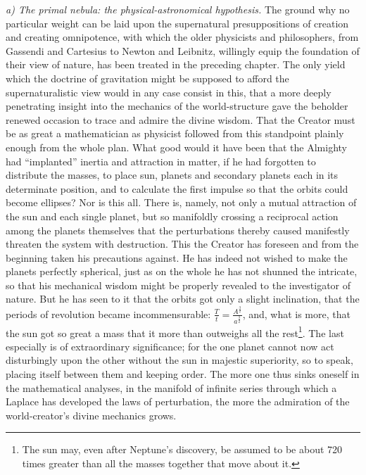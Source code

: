 \documentclass[12pt,a4paper]{book}
\newcommand{\runin}[1]{\emph{#1}\hspace{0.4em}}
\begin{document}
\runin{a) The primal nebula: the physical-astronomical hypothesis.} The ground why no particular weight
can be laid upon the supernatural presuppositions of creation and creating omnipotence, with which the
older physicists and philosophers, from Gassendi and Cartesius to Newton and Leibnitz, willingly equip the
foundation of their view of nature, has been treated in the preceding chapter. The only yield which the
doctrine of gravitation might be supposed to afford the supernaturalistic view would in any case consist
in this, that a more deeply penetrating insight into the mechanics of the world-structure gave the
beholder renewed occasion to trace and admire the divine wisdom. That the Creator must be as great a
mathematician as physicist followed from this standpoint plainly enough from the whole plan. What good
would it have been that the Almighty had ``implanted'' inertia and attraction in matter, if he had
forgotten to distribute the masses, to place sun, planets and secondary planets each in its determinate
position, and to calculate the first impulse so that the orbits could become ellipses? Nor is this all.
There is, namely, not only a mutual attraction of the sun and each single planet, but so manifoldly
crossing a reciprocal action among the planets themselves that the perturbations thereby caused manifestly
threaten the system
with destruction. This the Creator has foreseen and from the beginning taken his precautions against. He
has indeed not wished to make the planets perfectly spherical, just as on the whole he has not shunned the
intricate, so that his mechanical wisdom might be properly revealed to the investigator of nature. But he
has seen to it that the orbits got only a slight inclination, that
the periods of revolution became incommensurable:
$\frac{T}{t} = \frac{A^{\frac{3}{2}}}{a^{\frac{3}{2}}}$,
and, what is more, that the sun got so great a mass that it more than outweighs all the
rest\footnote{%
The sun may, even after Neptune's discovery, be assumed to be about 720 times greater than all the masses
together that move about it.}. The last especially is of extraordinary significance; for the one planet
cannot now act disturbingly upon the other without the sun in majestic superiority, so to speak, placing
itself between them and keeping order. The more one thus sinks oneself in the mathematical analyses, in
the manifold of infinite series through which a Laplace has developed the laws of perturbation, the more
the admiration of the world-creator's divine mechanics grows.
\end{document}
